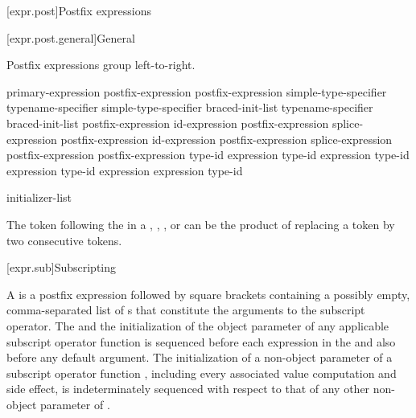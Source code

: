 [expr.post]{Postfix expressions}%

[expr.post.general]{General}%

\pnum
Postfix expressions group left-to-right.

\begin{bnf}
\br
    primary-expression\br
    postfix-expression \terminal{[}  \terminal{]}\br
    postfix-expression \terminal{(}  \terminal{)}\br
    simple-type-specifier \terminal{(}  \terminal{)}\br
    typename-specifier \terminal{(}  \terminal{)}\br
    simple-type-specifier braced-init-list\br
    typename-specifier braced-init-list\br
    postfix-expression   id-expression\br
    postfix-expression  splice-expression\br
    postfix-expression \terminal{->}  id-expression\br
    postfix-expression \terminal{->} splice-expression\br
    postfix-expression \terminal{++}\br
    postfix-expression \terminal{--}\br
     \terminal{<} type-id \terminal{>} \terminal{(} expression \terminal{)}\br
     \terminal{<} type-id \terminal{>} \terminal{(} expression \terminal{)}\br
     \terminal{<} type-id \terminal{>} \terminal{(} expression \terminal{)}\br
     \terminal{<} type-id \terminal{>} \terminal{(} expression \terminal{)}\br
     \terminal{(} expression \terminal{)}\br
     \terminal{(} type-id \terminal{)}
\end{bnf}

\begin{bnf}
\br
    initializer-list
\end{bnf}

\pnum
\begin{note}
The \tcode{>} token following the
 in a ,
, , or
 can be the product of replacing a
\tcode{>>} token by two consecutive \tcode{>}
tokens.
\end{note}

[expr.sub]{Subscripting}

\pnum
{}%
%
A  is a postfix expression
followed by square brackets containing
a possibly empty, comma-separated list of s
that constitute the arguments to the subscript operator.
The  and
the initialization of the object parameter of
any applicable subscript operator function is sequenced before
each expression in the  and also before
any default argument.
The initialization of a non-object parameter of
a subscript operator function ,
including every associated value computation and side effect,
is indeterminately sequenced with respect to that of
any other non-object parameter of .


